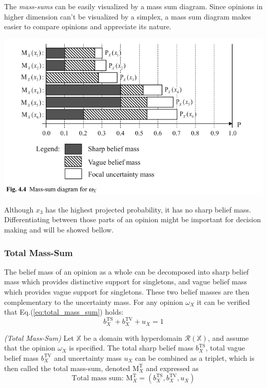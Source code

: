 The \emph{mass-sums} can be easily visualized by a mass sum diagram. Since opinions in higher
dimension can’t be visualized by a simplex, a mass sum diagram makes easier to compare
opinions and appreciate its nature.

\includegraphics[width=\linewidth]{images/fig.4.4.png}

Although $x_3$ has the highest projected probability, it has no sharp belief mass. Differentiating
between those parts of an opinion might be important for decision making and will be showed
bellow.

\subsubsection{Total Mass-Sum}

The belief mass of an opinion as a whole can be decomposed into sharp belief mass
which provides distinctive support for singletons, and vague belief mass which provides vague support for singletons. These two belief masses are then complementary
to the uncertainty mass. For any opinion $\omega_X$ it can be verified that Eq.(\ref{eq:total_mass_sum}) holds:
\begin{equation}\label{eq:total_mass_sum}
    b^{\mathrm{TS}}_X + b^{\mathrm{TV}}_X + u_X = 1
\end{equation}

\begin{definition}
    \emph{(Total Mass-Sum)} Let $\mathbb{X}$ be a domain with hyperdomain $\mathcal{R}(\mathbb{X})$, and
assume that the opinion $\omega_X$ is specified. The total sharp belief mass $b^{\mathrm{TS}}_X$, total vague
belief mass $b^{\mathrm{TV}}_X$ and uncertainty mass $u_X$ can be combined as a triplet, which is then called the total mass-sum, denoted $\mathrm{M}^{\mathrm{T}}_X$ and expressed as
    \begin{equation}
        \text{Total mass sum: } \mathrm{M}^{\mathrm{T}}_X = \left( b^{\mathrm{TS}}_X, b^{\mathrm{TV}}_X, u_X \right)
    \end{equation}
\end{definition}

